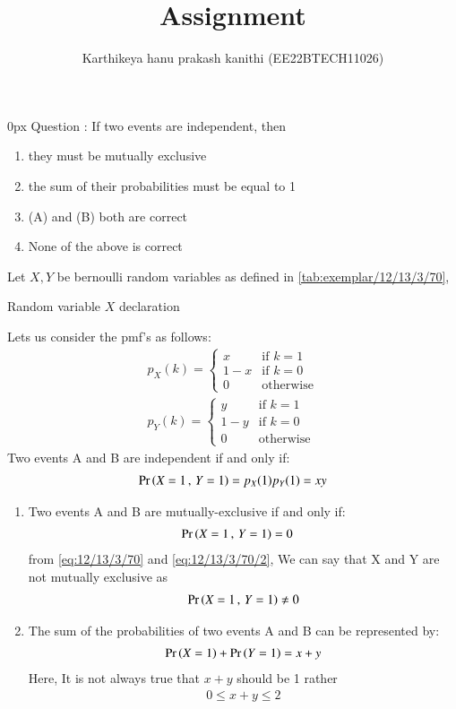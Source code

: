 \documentclass[article]{IEEEtran}
\theoremstyle{remark}
\begin{document}
\let\vec\mathbf


\title{
Assignment
}
\author{ Karthikeya hanu prakash kanithi (EE22BTECH11026)}
\maketitle
\parindent0px
\vspace{3cm}
Question : If two events are independent, then
\begin{enumerate}
\item they must be mutually exclusive
\item the sum of their probabilities must be equal to 1
\item (A) and (B) both are correct
\item None of the above is correct
\end{enumerate}
\solution 
Let $X,Y$ be bernoulli random variables as defined in  \autoref{tab:exemplar/12/13/3/70},
\begin{table}[h]
	\centering
	
	\caption{Random variable $X$ declaration}
        \label{tab:exemplar/12/13/3/70}
\end{table}
Lets us consider the pmf's as follows:
\begin{align}
p_X(k) = 
\begin{cases}
  x & \text{if } k = 1 \\
  1-x & \text{if } k = 0 \\
  0 & \text{otherwise}
\end{cases} \\
p_Y(k) = 
\begin{cases}
  y & \text{if } k = 1 \\
  1-y & \text{if } k = 0 \\
  0 & \text{otherwise}
\end{cases}
\end{align}
Two events A and B are independent if and only if:
\begin{align}
\Pr\left(X=1\,,\,Y=1\right)= p_X(1)p_Y(1) = xy \label{eq:12/13/3/70}
\end{align}
\begin{enumerate}
\item Two events A and B are mutually-exclusive if and only if:
\begin{align}
\Pr\left(X=1\,,\,Y=1\right)&= 0 \label{eq:12/13/3/70/2}
\end{align}
from \eqref{eq:12/13/3/70} and \eqref{eq:12/13/3/70/2}, We can say that X and Y are not mutually exclusive as
\begin{align}
\Pr\left(X=1\,,\,Y=1\right) \neq 0 
\end{align}
\item The sum of the probabilities of two events A and B can be represented by:
\begin{align}
\Pr\left(X=1\right)+\Pr\left(Y=1\right) = x+y
\end{align}
Here, It is not always true that $x+y$ should be 1 rather 
\begin{align}
0 \le x+y \le 2 
\end{align}
\end{enumerate}
\end{document}
